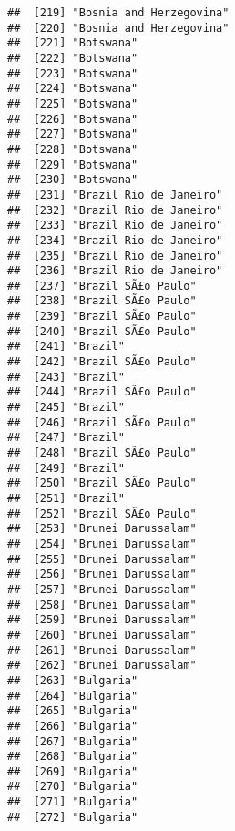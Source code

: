 \documentclass[]{article}
\begin{document}
\begin{verbatim}
##  [219] "Bosnia and Herzegovina"             
##  [220] "Bosnia and Herzegovina"             
##  [221] "Botswana"                           
##  [222] "Botswana"                           
##  [223] "Botswana"                           
##  [224] "Botswana"                           
##  [225] "Botswana"                           
##  [226] "Botswana"                           
##  [227] "Botswana"                           
##  [228] "Botswana"                           
##  [229] "Botswana"                           
##  [230] "Botswana"                           
##  [231] "Brazil Rio de Janeiro"              
##  [232] "Brazil Rio de Janeiro"              
##  [233] "Brazil Rio de Janeiro"              
##  [234] "Brazil Rio de Janeiro"              
##  [235] "Brazil Rio de Janeiro"              
##  [236] "Brazil Rio de Janeiro"              
##  [237] "Brazil SÃ£o Paulo"                   
##  [238] "Brazil SÃ£o Paulo"                   
##  [239] "Brazil SÃ£o Paulo"                   
##  [240] "Brazil SÃ£o Paulo"                   
##  [241] "Brazil"                             
##  [242] "Brazil SÃ£o Paulo"                   
##  [243] "Brazil"                             
##  [244] "Brazil SÃ£o Paulo"                   
##  [245] "Brazil"                             
##  [246] "Brazil SÃ£o Paulo"                   
##  [247] "Brazil"                             
##  [248] "Brazil SÃ£o Paulo"                   
##  [249] "Brazil"                             
##  [250] "Brazil SÃ£o Paulo"                   
##  [251] "Brazil"                             
##  [252] "Brazil SÃ£o Paulo"                   
##  [253] "Brunei Darussalam"                  
##  [254] "Brunei Darussalam"                  
##  [255] "Brunei Darussalam"                  
##  [256] "Brunei Darussalam"                  
##  [257] "Brunei Darussalam"                  
##  [258] "Brunei Darussalam"                  
##  [259] "Brunei Darussalam"                  
##  [260] "Brunei Darussalam"                  
##  [261] "Brunei Darussalam"                  
##  [262] "Brunei Darussalam"                  
##  [263] "Bulgaria"                           
##  [264] "Bulgaria"                           
##  [265] "Bulgaria"                           
##  [266] "Bulgaria"                           
##  [267] "Bulgaria"                           
##  [268] "Bulgaria"                           
##  [269] "Bulgaria"                           
##  [270] "Bulgaria"                           
##  [271] "Bulgaria"                           
##  [272] "Bulgaria"                           

\end{verbatim}
\end{document}
